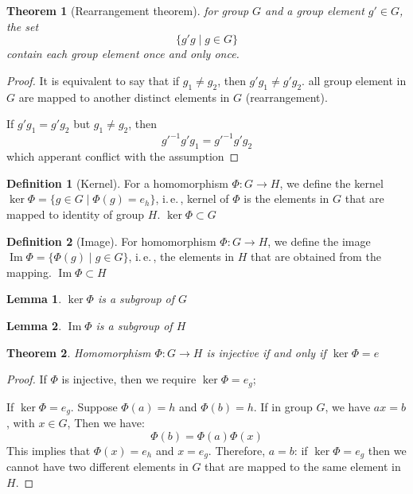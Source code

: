 \documentclass{amsart}
\newtheorem*{theorem}{Theorem}
\newtheorem*{lemma}{Lemma}
\theoremstyle{remark}
\theoremstyle{remark}
\theoremstyle{definition}
\newtheorem*{definition}{Definition}
\DeclareMathOperator{\Image}{Im}
\begin{document}
\vspace{10pt}

\begin{theorem}[Rearrangement theorem]
    for group $G$ and a group element $g'\in G$, the set 
    \[\{g'g \mid g \in G\}\]
    contain each group element once and only once.
\end{theorem}
\begin{proof}
    It is equivalent to say that if $g_1 \neq g_2$, then $g'g_1 \neq g'g_2$. all group element in $G$ are mapped 
    to another distinct elements in $G$ (rearrangement).

    If $g'g_1 = g'g_2$ but $g_1 \neq g_2$, then 
    \[ g'^{-1}g'g_1 = g'^{-1}g'g_2 \] which apperant conflict with the assumption
\end{proof}

\vspace{10pt}

\begin{definition}
    [Kernel] For a homomorphism $\Phi\colon G \to H$, we define the kernel $\ker\Phi = \{g\in G\mid \Phi(g) = e_h \}$, i.\,e.\,,
    kernel of $\Phi$ is the elements in $G$ that are mapped to identity of group $H$. $\ker\Phi \subset G$
\end{definition}

\begin{definition}
    [Image] For homomorphism $\Phi\colon G \to H$, we define the image $\Image\Phi = \{ \Phi(g) \mid g \in G \}$, i.\,e.\,,
    the elements in $H$ that are obtained from the mapping. $\Image\Phi \subset H$
\end{definition}

\begin{lemma}
    $\ker\Phi$ is a subgroup of $G$
\end{lemma}
\begin{lemma}
    $\Image\Phi$ is a subgroup of $H$
\end{lemma}

\vspace{10pt}

\begin{theorem}
    Homomorphism $\Phi\colon G\to H$ is injective if and only if $\ker \Phi = e$
\end{theorem}
\begin{proof}
    If $\Phi$ is injective, then we require $\ker \Phi = e_g$; 

    If $\ker \Phi = e_g$. Suppose $\Phi(a) = h$ and $\Phi(b) = h$. If in group $G$, we have $ax = b$, with $x\in G$, 
    Then we have:
    \[  
        \Phi(b) = \Phi(a)\Phi(x)    
    \]
    This implies that $\Phi(x)=e_h$ and $x = e_g$. Therefore, $a = b$: if $\ker \Phi = e_g$ then we cannot have
    two different elements in $G$ that are mapped to the same element in $H$.
\end{proof}
\end{document}
